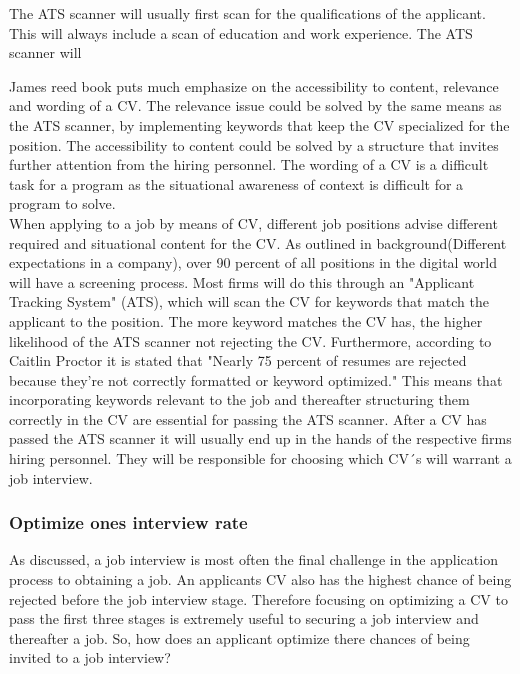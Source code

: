 The ATS scanner will usually first scan for the qualifications of the applicant.
This will always include a scan of education and work experience. 
The ATS scanner will 




James reed book puts much emphasize on the accessibility to content, relevance and wording of a CV. \cite{7_second_test}
The relevance issue could be solved by the same means as the ATS scanner, by implementing keywords that keep the CV specialized for the position.
The accessibility to content could be solved by a structure that invites further attention from the hiring personnel.
The wording of a CV is a difficult task for a program as the situational awareness of context is difficult for a program to solve.
\cite{7_Seconds_to_Get_a_Recruiter_Attention}
\cite{ATS-scanner}
\cite{7_second_test} \\


When applying to a job by means of CV, different job positions advise different required and situational content for the CV.
As outlined in background(Different expectations in a company), over 90 percent of all positions in the digital world will have a screening process.
Most firms will do this through an "Applicant Tracking System" (ATS), which will scan the CV for keywords that match the applicant to the position.
The more keyword matches the CV has, the higher likelihood of the ATS scanner not rejecting the CV.
Furthermore, according to Caitlin Proctor it is stated that "Nearly 75 percent of resumes are rejected because they’re not correctly formatted or keyword optimized."
This means that incorporating keywords relevant to the job and thereafter structuring them correctly in the CV are essential for passing the ATS scanner.
After a CV has passed the ATS scanner it will usually end up in the hands of the respective firms hiring personnel. 
They will be responsible for choosing which CV´s will warrant a job interview. \\

\subsubsection{Optimize ones interview rate}
As discussed, a job interview is most often the final challenge in the application process to obtaining a job. 
An applicants CV also has the highest chance of being rejected before the job interview stage.
Therefore focusing on optimizing a CV to pass the first three stages is extremely useful to securing a job interview and thereafter a job.
So, how does an applicant optimize there chances of being invited to a job interview? \\

